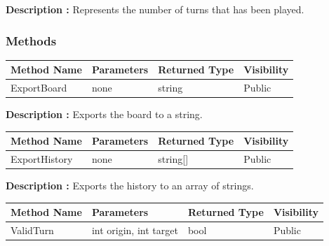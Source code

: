 \documentclass[12pt]{article}
\begin{document}
    \textbf{Description :} Represents the number of turns that has been played.

    \subsubsection{Methods}

    \begin{table}[H]
        \begin{tabular}{|l|l|l|l|}
            \hline
            \rowcolor[HTML]{EFEFEF}
            \cellcolor[HTML]{EFEFEF}\textbf{Method Name} & \textbf{Parameters} & \textbf{Returned Type} & \textbf{Visibility} \\ \hline
            ExportBoard                                  & none                & string                 & Public              \\ \hline
        \end{tabular}
    \end{table}

    \textbf{Description :} Exports the board to a string.

    \begin{table}[H]
        \begin{tabular}{|l|l|l|l|}
            \hline
            \rowcolor[HTML]{EFEFEF}
            \cellcolor[HTML]{EFEFEF}\textbf{Method Name} & \textbf{Parameters} & \textbf{Returned Type} & \textbf{Visibility} \\ \hline
            ExportHistory                                & none                & string[]               & Public              \\ \hline
        \end{tabular}
    \end{table}

    \textbf{Description :} Exports the history to an array of strings.

    \begin{table}[H]
        \begin{tabular}{|l|l|l|l|}
            \hline
            \rowcolor[HTML]{EFEFEF}
            \cellcolor[HTML]{EFEFEF}\textbf{Method Name} & \textbf{Parameters}    & \textbf{Returned Type} & \textbf{Visibility} \\ \hline
            ValidTurn                                    & int origin, int target & bool                   & Public              \\ \hline
        \end{tabular}
    \end{table}
\end{document}
